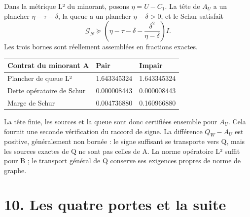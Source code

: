 \documentclass[
  10pt,
  a4paper,
]{article}
\begin{document}
Dans la métrique L² du minorant, posons \(\eta=U-C_1\). La tête de
\(A_U\) a un plancher \(\eta-\tau-\delta\), la queue a un plancher
\(\eta-\delta>0\), et le Schur satisfait \[
\mathcal G_N\succeq
\left(\eta-\tau-\delta-\frac{\delta^2}{\eta-\delta}\right)I.
\] Les trois bornes sont réellement assemblées en fractions exactes.

\begin{longtable}[]{@{}lll@{}}
\toprule\noalign{}
Contrat du minorant A & Pair & Impair \\
\midrule\noalign{}
\endhead
\bottomrule\noalign{}
\endlastfoot
Plancher de queue L² & 1.643345324 & 1.643345324 \\
Dette opératoire de Schur & 0.000008443 & 0.000008443 \\
Marge de Schur & 0.004736880 & 0.160966880 \\
\end{longtable}

La tête finie, les sources et la queue sont donc certifiées ensemble
pour \(A_U\). Cela fournit une seconde vérification du raccord de signe.
La différence \(Q_W-A_U\) est positive, généralement non bornée : le
signe suffisant se transporte vers Q, mais les sources exactes de Q ne
sont pas celles de A. La norme opératoire L² suffit pour B ; le
transport général de Q conserve ses exigences propres de norme de
graphe.

\hypertarget{les-quatre-portes-et-la-suite}{%
\section{10. Les quatre portes et la
suite}\label{les-quatre-portes-et-la-suite}}
\end{document}
